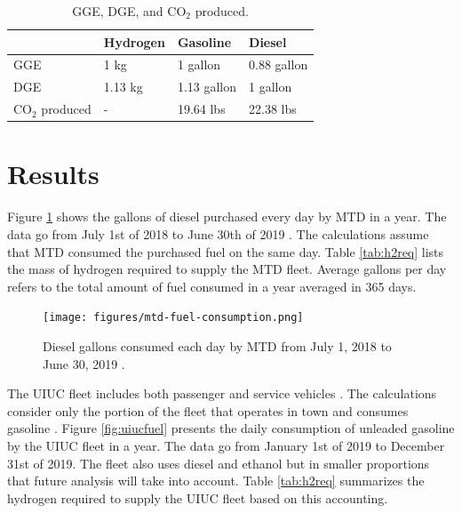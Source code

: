 \documentclass{anstrans}
\begin{document}
\begin{table}[]
	\centering
    \caption{\gls{GGE}, \gls{DGE}, and CO$_2$ produced.}
    \label{tab:meth}
	\begin{tabular}{l|lll}
	\hline
	                 & Hydrogen & Gasoline    & Diesel      \\ \hline
	GGE              & 1 kg     & 1 gallon    & 0.88 gallon \\
	DGE              & 1.13 kg  & 1.13 gallon & 1 gallon    \\
    CO$_2$ produced  & -        & 19.64 lbs   & 22.38 lbs   \\ \hline

	\end{tabular}
\end{table}

\section{Results}

Figure \ref{fig:mtdfuel} shows the gallons of diesel purchased every day by \gls{MTD} in a year. The data go from July 1st of 2018 to June 30th of 2019 \cite{mtd_irecords_2019}. The calculations assume that MTD consumed the purchased fuel on the same day.
Table \ref{tab:h2req} lists the mass of hydrogen required to supply the \gls{MTD} fleet. Average gallons per day refers to the total amount of fuel consumed in a year averaged in 365 days.

\begin{figure}[H]
	\centering
	\texttt{[image: figures/mtd-fuel-consumption.png]}
	\hfill
	\caption{Diesel gallons consumed each day by \gls{MTD} from July 1, 2018 to June 30, 2019 \cite{mtd_irecords_2019}.}
	\label{fig:mtdfuel}
\end{figure}

The \gls{UIUC} fleet includes both passenger and service vehicles \cite{uiuc_institute_for_sustainability_energy_and_environment_increase_2020}. The calculations consider only the portion of the fleet that operates in town and consumes gasoline \cite{uiuc_personnal_communication}. Figure \ref{fig:uiucfuel} presents the daily consumption of unleaded gasoline by the \gls{UIUC} fleet in a year. The data go from January 1st of 2019 to December 31st of 2019. The fleet also uses diesel and ethanol but in smaller proportions that future analysis will take into account.
Table \ref{tab:h2req} summarizes the hydrogen required to supply the \gls{UIUC} fleet based on this accounting.
\end{document}
